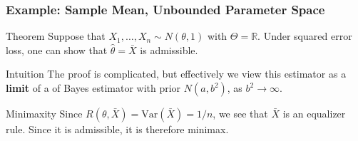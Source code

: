 \begin{frame}
  \frametitle{Example: Sample Mean, Unbounded Parameter Space}

  \begin{block}{Theorem}
    Suppose that $X_1, \dots, X_n \sim N(\theta, 1)$ with $\Theta = \mathbb{R}$.
    Under squared error loss, one can show that $\widehat{\theta} = \bar{X}$ is admissible.
  \end{block}

  \begin{block}{Intuition}
    The proof is complicated, but effectively we view this estimator as a \textbf{limit} of a of Bayes estimator with prior $N(a, b^2)$, as $b^2 \rightarrow \infty$.
  \end{block}

  \begin{block}{Minimaxity}
    Since $R(\theta, \bar{X}) = \mbox{Var}(\bar{X}) = 1/n$, we see that $\bar{X}$ is an equalizer rule.
    Since it is admissible, it is therefore minimax.
  \end{block}

\end{frame}


